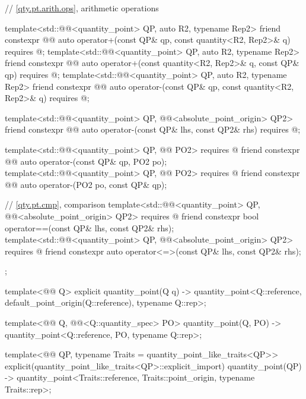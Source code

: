 \begin{codeblock}
{{  // \ref{qty.pt.arith.ops}, arithmetic operations

  template<std::@@<quantity_point> QP, auto R2, typename Rep2>
  friend constexpr @@ auto operator+(const QP& qp, const quantity<R2, Rep2>& q)
    requires @\seebelownc@;
  template<std::@@<quantity_point> QP, auto R2, typename Rep2>
  friend constexpr @@ auto operator+(const quantity<R2, Rep2>& q, const QP& qp)
    requires @\seebelownc@;
  template<std::@@<quantity_point> QP, auto R2, typename Rep2>
  friend constexpr @@ auto operator-(const QP& qp, const quantity<R2, Rep2>& q)
    requires @\seebelownc@;

  template<std::@@<quantity_point> QP, @@<absolute_point_origin> QP2>
  friend constexpr @@ auto operator-(const QP& lhs, const QP2& rhs)
    requires @\seebelownc@;

  template<std::@@<quantity_point> QP, @@ PO2>
    requires @\seebelownc@
  friend constexpr @@ auto operator-(const QP& qp, PO2 po);
  template<std::@@<quantity_point> QP, @@ PO2>
    requires @\seebelownc@
  friend constexpr @@ auto operator-(PO2 po, const QP& qp);

  // \ref{qty.pt.cmp}, comparison
  template<std::@@<quantity_point> QP, @@<absolute_point_origin> QP2>
    requires @\seebelownc@
  friend constexpr bool operator==(const QP& lhs, const QP2& rhs);
  template<std::@@<quantity_point> QP, @@<absolute_point_origin> QP2>
    requires @\seebelownc@
  friend constexpr auto operator<=>(const QP& lhs, const QP2& rhs);
};

template<@@ Q>
explicit quantity_point(Q q)
  -> quantity_point<Q::reference, default_point_origin(Q::reference), typename Q::rep>;

template<@@ Q, @@<Q::quantity_spec> PO>
quantity_point(Q, PO) -> quantity_point<Q::reference, PO{}, typename Q::rep>;

template<@@ QP, typename Traits = quantity_point_like_traits<QP>>
explicit(quantity_point_like_traits<QP>::explicit_import) quantity_point(QP)
  -> quantity_point<Traits::reference, Traits::point_origin, typename Traits::rep>;

}
\end{codeblock}

